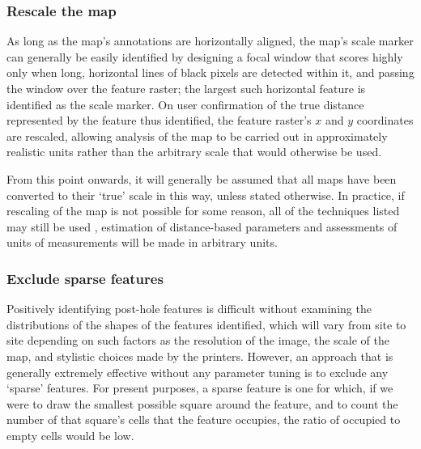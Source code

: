 \documentclass[../../ArchStats.tex]{subfiles}
\begin{document}
\subsubsection{Rescale the map}

As long as the map's annotations are horizontally aligned, the map's scale marker can generally be easily identified by designing a focal window that scores highly only when long, horizontal lines of black pixels are detected within it, and passing the window over the feature raster; the largest such horizontal feature is identified as the scale marker. On user confirmation of the true distance represented by the feature thus identified, the feature raster's $x$ and $y$ coordinates are rescaled, allowing analysis of the map to be carried out in approximately realistic units rather than the arbitrary scale that would otherwise be used.

From this point onwards, it will generally be assumed that all maps have been converted to their `true' scale in this way, unless stated otherwise. In practice, if rescaling of the map is not possible for some reason, all of the techniques listed may still be used , estimation of distance-based parameters and assessments of units of measurements  will be made in arbitrary units.


\subsubsection{Exclude sparse features}

Positively identifying post-hole features is difficult without examining the distributions of the shapes of the features identified, which will vary from site to site depending on such factors as the resolution of the image, the scale of the map, and stylistic choices made by the printers. However, an approach that is generally extremely effective without any parameter tuning is to exclude any `sparse' features. For present  purposes, a sparse feature is one for which, if we were to draw the smallest possible square around the feature, and to count the number of that square's cells that the feature occupies, the ratio of occupied to empty cells would be low.
\end{document}
